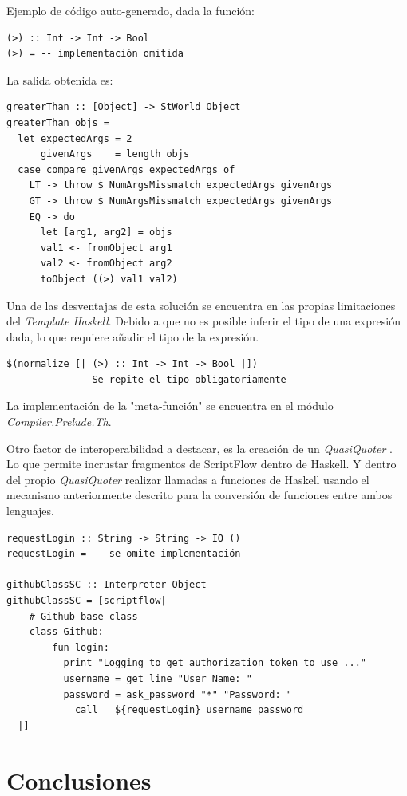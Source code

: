 \documentclass[11pt]{article}
\begin{document}
Ejemplo de código auto-generado, dada la función:
\begin{verbatim}
(>) :: Int -> Int -> Bool
(>) = -- implementación omitida
\end{verbatim}

La salida obtenida es:
\begin{verbatim}
greaterThan :: [Object] -> StWorld Object
greaterThan objs =
  let expectedArgs = 2
      givenArgs    = length objs
  case compare givenArgs expectedArgs of
    LT -> throw $ NumArgsMissmatch expectedArgs givenArgs
    GT -> throw $ NumArgsMissmatch expectedArgs givenArgs
    EQ -> do
      let [arg1, arg2] = objs
      val1 <- fromObject arg1
      val2 <- fromObject arg2
      toObject ((>) val1 val2)
\end{verbatim}

Una de las desventajas de esta solución se encuentra en las propias limitaciones del \emph{Template Haskell}. Debido a que no es posible
inferir el tipo de una expresión dada, lo que requiere añadir el tipo de la expresión.
\begin{verbatim}
$(normalize [| (>) :: Int -> Int -> Bool |])
            -- Se repite el tipo obligatoriamente
\end{verbatim}

La implementación de la "meta-función" se encuentra en el módulo \emph{Compiler.Prelude.Th}.

Otro factor de interoperabilidad a destacar, es la creación de un \emph{QuasiQuoter} \cite{quasi-quoter}. Lo que permite incrustar fragmentos de ScriptFlow
dentro de Haskell. Y dentro del propio \emph{QuasiQuoter} realizar llamadas a funciones de Haskell usando el mecanismo anteriormente descrito
para la conversión de funciones entre ambos lenguajes.

\begin{verbatim}
requestLogin :: String -> String -> IO ()
requestLogin = -- se omite implementación

githubClassSC :: Interpreter Object
githubClassSC = [scriptflow|
    # Github base class
    class Github:
        fun login:
          print "Logging to get authorization token to use ..."
          username = get_line "User Name: "
          password = ask_password "*" "Password: "
          __call__ ${requestLogin} username password
  |]
\end{verbatim}

\section{Conclusiones}
\label{sec:org7f52a6d}
\end{document}

